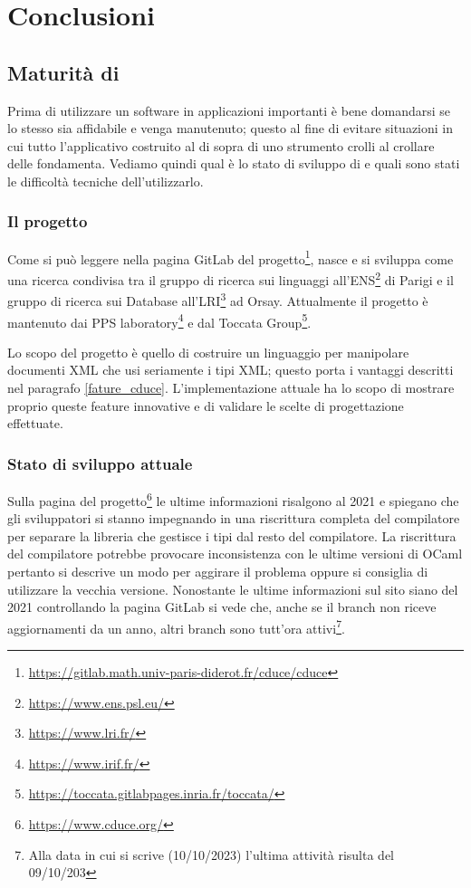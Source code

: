 \chapter{Conclusioni}
\section{Maturità di \cduce}
Prima di utilizzare un software in applicazioni importanti è bene domandarsi se lo stesso sia affidabile e venga manutenuto; questo al fine di evitare situazioni in cui tutto l'applicativo costruito al di sopra di uno strumento crolli al crollare delle fondamenta. Vediamo quindi qual è lo stato di sviluppo di \cduce e quali sono stati le difficoltà tecniche dell'utilizzarlo.
\subsection{Il progetto \cduce}
Come si può leggere nella pagina GitLab del progetto\footnote{\url{https://gitlab.math.univ-paris-diderot.fr/cduce/cduce}}, \cduce nasce e si sviluppa come una ricerca condivisa tra il gruppo di ricerca sui linguaggi all'ENS\footnote{\url{https://www.ens.psl.eu/}} di Parigi e il gruppo di ricerca sui Database all'LRI\footnote{\url{https://www.lri.fr/}} ad Orsay. Attualmente il progetto è mantenuto dai PPS laboratory\footnote{\url{https://www.irif.fr/}} e dal  Toccata Group\footnote{\url{https://toccata.gitlabpages.inria.fr/toccata/}}.

Lo scopo del progetto è quello di costruire un linguaggio per manipolare documenti XML che usi seriamente i tipi XML; questo porta i vantaggi descritti nel paragrafo \ref{fature_cduce}. L'implementazione attuale ha lo scopo di mostrare proprio queste feature innovative e di validare le scelte di progettazione effettuate.
\subsection{Stato di sviluppo attuale}
Sulla pagina del progetto\footnote{\url{https://www.cduce.org/}} le ultime informazioni risalgono al 2021 e spiegano che gli sviluppatori si stanno impegnando in una riscrittura completa del compilatore per separare la libreria che gestisce i tipi dal resto del compilatore. La riscrittura del compilatore potrebbe provocare inconsistenza con le ultime versioni di OCaml pertanto si descrive un modo per aggirare il problema oppure si consiglia di utilizzare la vecchia versione. Nonostante le ultime informazioni sul sito siano del 2021 controllando la pagina GitLab si vede che, anche se il branch  non riceve aggiornamenti da un anno, altri branch sono tutt'ora attivi\footnote{Alla data in cui si scrive (10/10/2023) l'ultima attività risulta del 09/10/203}.
